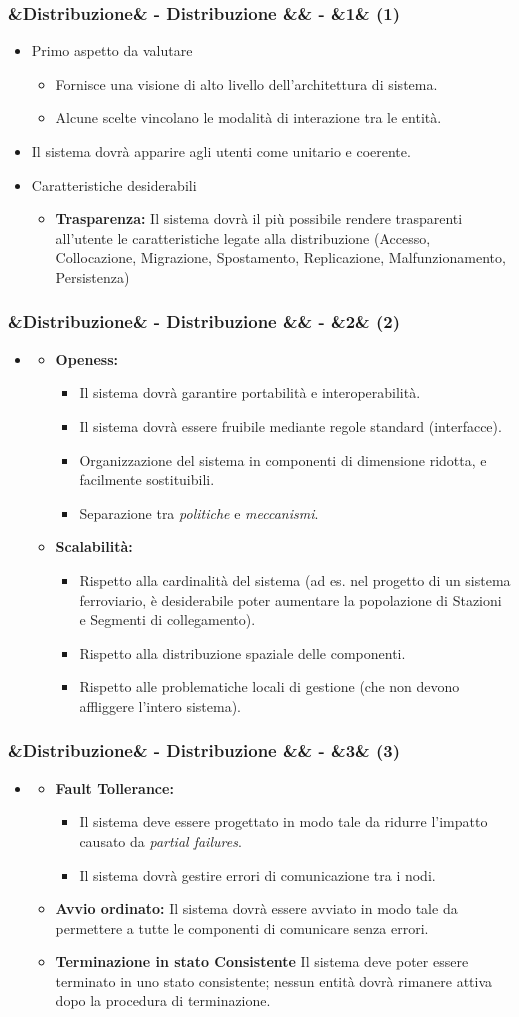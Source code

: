 \documentclass[slidestop,compress,blackandwhite]{beamer}
\newcommand{\itemB}[3]{
	\item \textbf{#1} #2 \vspace{#3}
}
\newcommand{\ii}[1]{\textit{#1}}
\newcommand{\cm}[1]{\vspace{#1cm}}
\newcommand{\newtitle}[4]{
	#1 
	\ifx&#2&%
	\else
  		\large- #2
	\fi
	\ifx&#3&%
	\else
  		\normalsize- #3
	\fi
	\ifx&#4&%
	\else
  		\normalsize (#4)
	\fi
}
\newcommand{\newframe}[5]{
	\begin{frame}
		\frametitle{\newtitle{#1}{#2}{#3}{#4}}
		#5
	\end{frame}
}
\newcommand{\myitemize}[1]{
	\begin{itemize}\itemsep4pt
	#1
	\end{itemize}
}
\begin{document}
	\newframe{}{Distribuzione}{}{1}{
		\cm{0.5}
		\myitemize {
			\item Primo aspetto da valutare
				\myitemize {
					\item Fornisce una visione di alto livello dell'architettura di sistema.
					\item Alcune scelte vincolano le modalità di interazione tra le entità.
				}
			\cm{0.2}
			\item Il sistema dovrà apparire agli utenti come unitario e coerente. 
			\cm{0.2}
			\item Caratteristiche desiderabili
				\myitemize {
					\itemB{Trasparenza:}{Il sistema dovrà il più possibile rendere trasparenti all'utente le caratteristiche legate alla distribuzione (Accesso, Collocazione, Migrazione, Spostamento, Replicazione, Malfunzionamento, Persistenza)}{0.1cm}
				}
		}
	}
	
	\newframe{}{Distribuzione}{}{2}{
		\myitemize {
			\item[]
				\myitemize {
					\itemB{Openess:}{\justifying
						\myitemize {
							\item Il sistema dovrà garantire portabilità e interoperabilità.
							\item Il sistema dovrà essere fruibile mediante regole standard (interfacce).
							\item \justifying Organizzazione del sistema in componenti di dimensione ridotta, e facilmente sostituibili.
							\item Separazione tra \ii{politiche} e \ii{meccanismi}.
						}
					}{0.1cm}
					\itemB{Scalabilità:}{\justifying
						\myitemize {
							\item Rispetto alla cardinalità del sistema (ad es. nel progetto di un sistema ferroviario, è desiderabile poter aumentare la popolazione di Stazioni e Segmenti di collegamento).
							\item Rispetto alla distribuzione spaziale delle componenti.
							\item Rispetto alle problematiche locali di gestione (che non devono affliggere l'intero sistema).
						}
					}{0.1cm}
				}
		}
	}
	
	\newframe{}{Distribuzione}{}{3}{
		\cm{0.5}
		\myitemize {
			\item[]
				\myitemize {
					\itemB{Fault Tollerance:}{
						\myitemize{
							\item Il sistema deve essere progettato in modo tale da ridurre l'impatto causato da \ii{partial failures}.
							\item Il sistema dovrà gestire errori di comunicazione tra i nodi.
						}
					}{0.1cm}
					
					\itemB{Avvio ordinato:}{\justifying Il sistema dovrà essere avviato in modo tale da permettere a tutte le componenti di comunicare senza errori.}{0.1cm}
					\itemB{Terminazione in stato Consistente}{\justifying Il sistema deve poter essere terminato in uno stato consistente; nessun entità dovrà rimanere attiva dopo la procedura di terminazione.}{0.1cm}
				}
				
		}
	}
	
\end{document}
